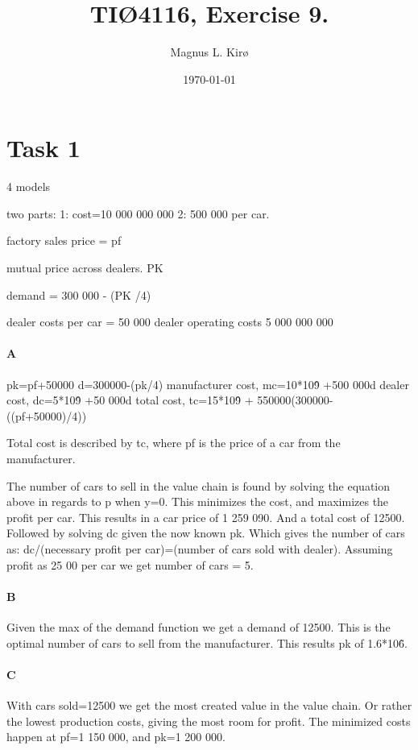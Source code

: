 \documentclass[12pt, a4paper]{article}
\title{
	TIØ4116, Exercise 9. 
}
\author{
	Magnus L. Kirø \\
}
\date{\today}
\begin{document}
\maketitle
{}

\section{Task 1}
4 models

two parts:
1: cost=10 000 000 000
2: 500 000 per car. 

factory sales price = pf

mutual price across dealers. PK

demand = 300 000 - (PK /4)

dealer costs per car = 50 000
dealer operating costs 5 000 000 000

\paragraph{A}
pk=pf+50000
d=300000-(pk/4)
manufacturer cost, mc=10*10\^9 +500 000d
dealer cost, dc=5*10\^9 +50 000d
total cost, tc=15*10\^9 + 550000(300000-((pf+50000)/4))

Total cost is described by tc, where pf is
the price of a car from the manufacturer. 

The number of cars to sell in the value chain is found by solving the equation
above in regards to p when y=0. This minimizes the cost, and maximizes the
profit per car. This results in a car price of 1 259 090. And a total cost of
12500. Followed by solving dc given the now known pk. Which gives the number of
cars as: dc/(necessary profit per car)=(number of cars sold with dealer).
Assuming profit as 25 00 per car we get number of cars = 5. 

\paragraph{B}
Given the max of the demand function we get a demand of 12500. This is the
optimal number of cars to sell from the manufacturer. This results pk of 1.6*10\^6. 

\paragraph{C}
With cars sold=12500 we get the most created value in the value chain. Or
rather the lowest production costs, giving the most room for profit. 
The minimized costs happen at pf=1 150 000, and pk=1 200 000. 
\end{document}
